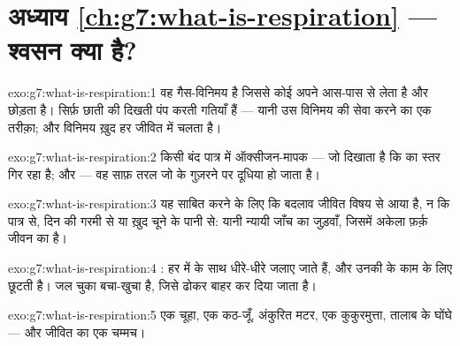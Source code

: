 \section*{अध्याय \ref{ch:g7:what-is-respiration} --- श्वसन क्या है?}

\begin{solution}{exo:g7:what-is-respiration:1}
 वह गैस-विनिमय है जिससे कोई  अपने आस-पास से  लेता है और
 छोड़ता है।  सिर्फ़ छाती की दिखती पंप करती
गतियाँ हैं --- यानी उस विनिमय की सेवा करने का एक तरीक़ा; और विनिमय ख़ुद
हर जीवित  में चलता है।
\end{solution}

\begin{solution}{exo:g7:what-is-respiration:2}
किसी बंद पात्र में ऑक्सीजन-मापक --- जो दिखाता है कि  का स्तर गिर
रहा है; और  --- वह साफ़ तरल जो  के गुज़रने
पर दूधिया हो जाता है।
\end{solution}

\begin{solution}{exo:g7:what-is-respiration:3}
यह साबित करने के लिए कि बदलाव जीवित विषय से आया है, न कि पात्र से, दिन
की गरमी से या ख़ुद चूने के पानी से: यानी न्यायी जाँच का जुड़वाँ, जिसमें
अकेला फ़र्क़ जीवन का है।
\end{solution}

\begin{solution}{exo:g7:what-is-respiration:4}
: हर  में   के साथ धीरे-धीरे जलाए जाते हैं,
और उनकी   के काम के लिए छूटती है।  जल चुका
बचा-खुचा है, जिसे ढोकर बाहर कर दिया जाता है।
\end{solution}

\begin{solution}{exo:g7:what-is-respiration:5}
एक चूहा, एक कठ-जूँ, अंकुरित मटर, एक कुकुरमुत्ता, तालाब के घोंघे ---
और जीवित  का एक चम्मच।
\end{solution}


